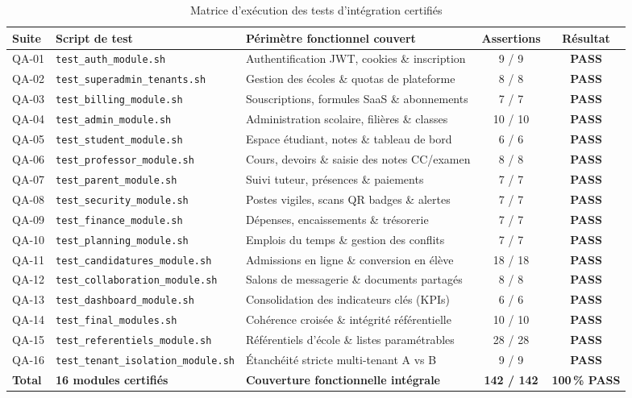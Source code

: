 \begin{table}[h]
\centering
\small
\begin{tabular}{llp{5.5cm}cc}
\toprule
\textbf{Suite} & \textbf{Script de test} & \textbf{Périmètre fonctionnel couvert} & \textbf{Assertions} & \textbf{Résultat} \\
\midrule
QA-01 & \texttt{test\_auth\_module.sh} & Authentification JWT, cookies \& inscription & 9 / 9 & \textbf{PASS} \\
QA-02 & \texttt{test\_superadmin\_tenants.sh} & Gestion des écoles \& quotas de plateforme & 8 / 8 & \textbf{PASS} \\
QA-03 & \texttt{test\_billing\_module.sh} & Souscriptions, formules SaaS \& abonnements & 7 / 7 & \textbf{PASS} \\
QA-04 & \texttt{test\_admin\_module.sh} & Administration scolaire, filières \& classes & 10 / 10 & \textbf{PASS} \\
QA-05 & \texttt{test\_student\_module.sh} & Espace étudiant, notes \& tableau de bord & 6 / 6 & \textbf{PASS} \\
QA-06 & \texttt{test\_professor\_module.sh} & Cours, devoirs \& saisie des notes CC/examen & 8 / 8 & \textbf{PASS} \\
QA-07 & \texttt{test\_parent\_module.sh} & Suivi tuteur, présences \& paiements & 7 / 7 & \textbf{PASS} \\
QA-08 & \texttt{test\_security\_module.sh} & Postes vigiles, scans QR badges \& alertes & 7 / 7 & \textbf{PASS} \\
QA-09 & \texttt{test\_finance\_module.sh} & Dépenses, encaissements \& trésorerie & 7 / 7 & \textbf{PASS} \\
QA-10 & \texttt{test\_planning\_module.sh} & Emplois du temps \& gestion des conflits & 7 / 7 & \textbf{PASS} \\
QA-11 & \texttt{test\_candidatures\_module.sh} & Admissions en ligne \& conversion en élève & 18 / 18 & \textbf{PASS} \\
QA-12 & \texttt{test\_collaboration\_module.sh} & Salons de messagerie \& documents partagés & 8 / 8 & \textbf{PASS} \\
QA-13 & \texttt{test\_dashboard\_module.sh} & Consolidation des indicateurs clés (KPIs) & 6 / 6 & \textbf{PASS} \\
QA-14 & \texttt{test\_final\_modules.sh} & Cohérence croisée \& intégrité référentielle & 10 / 10 & \textbf{PASS} \\
QA-15 & \texttt{test\_referentiels\_module.sh} & Référentiels d'école \& listes paramétrables & 28 / 28 & \textbf{PASS} \\
QA-16 & \texttt{test\_tenant\_isolation\_module.sh} & Étanchéité stricte multi-tenant A vs B & 9 / 9 & \textbf{PASS} \\
\midrule
\textbf{Total} & \textbf{16 modules certifiés} & \textbf{Couverture fonctionnelle intégrale} & \textbf{142 / 142} & \textbf{100\,\% PASS} \\
\bottomrule
\end{tabular}
\caption{Matrice d'exécution des tests d'intégration certifiés}
\label{tab:resultats-qa}
\end{table}

